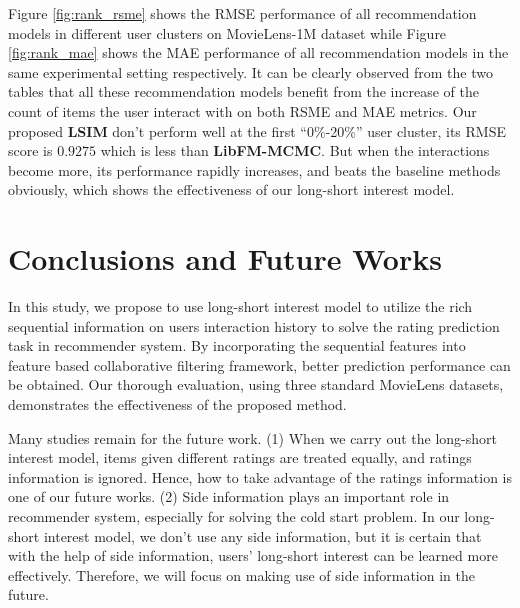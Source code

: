 \documentclass{llncs}
\begin{document}
Figure \ref{fig:rank_rsme} shows the RMSE performance of all recommendation models
in different user clusters on MovieLens-1M dataset while Figure \ref{fig:rank_mae}
shows the MAE performance of all recommendation models in the same experimental
setting respectively.
It can be clearly observed from the two tables that all these recommendation models
benefit from the increase of the count of items the user interact with on both
RSME and MAE metrics.
Our proposed \textbf{LSIM} don't perform well at the first ``0\%-20\%'' user cluster,
its RMSE score is $0.9275$ which is less than \textbf{LibFM-MCMC}.
But when the interactions become more, its performance rapidly increases,
and beats the baseline methods obviously, which shows the effectiveness of our
long-short interest model.

\section{Conclusions and Future Works}
In this study, we propose to use long-short interest model to utilize the rich
sequential information on users interaction history to solve the rating
prediction task in recommender system.
By incorporating the sequential features into feature based collaborative
filtering framework, better prediction performance can be obtained.
Our thorough evaluation, using three standard MovieLens datasets, demonstrates
the effectiveness of the proposed method.

Many studies remain for the future work.
(1) When we carry out the long-short interest model, items given different ratings
are treated equally, and ratings information is ignored. Hence, how to take advantage
of the ratings information is one of our future works. 
(2) Side information plays an important role in recommender system, especially
for solving the cold start problem. In our long-short interest model, we don't use
any side information, but it is certain that with the help of side information,
users' long-short interest can be learned more effectively. Therefore, we will focus
on making use of side information in the future.



\end{document}
